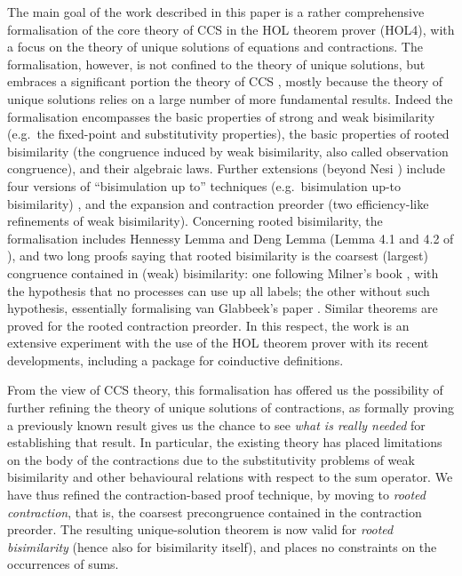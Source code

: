 The main goal of the work described in this paper is a rather
comprehensive formalisation of the core theory of CCS in the HOL
theorem prover (HOL4),  with a focus on the theory of unique solutions
of equations and contractions.
The formalisation, however, is not confined to the theory of unique
solutions, but embraces a
significant portion the theory of CCS \cite{Mil89}, mostly because the
theory of unique solutions relies on a large number of more fundamental results.
Indeed the formalisation encompasses the basic properties of strong and weak
bisimilarity (e.g.~the fixed-point and substitutivity properties), the
basic properties of
rooted bisimilarity (the congruence induced by weak
bisimilarity, also called observation congruence), and
their algebraic laws. Further extensions (beyond Nesi
\cite{Nesi:1992ve}) include four versions of ``bisimulation up to''
techniques (e.g.~bisimulation up-to bisimilarity) \cite{Mil89,sangiorgi1992problem}, and the
expansion and contraction preorder (two
efficiency-like refinements of weak bisimilarity). Concerning rooted bisimilarity, the formalisation
includes Hennessy Lemma and Deng Lemma (Lemma 4.1 and 4.2 of
\cite{Gorrieri:2015jt}),
 and two long proofs saying that  rooted bisimilarity is the coarsest (largest)
 congruence contained in (weak) bisimilarity: one following Milner's
 book \cite{Mil89}, with the hypothesis that no processes can use up
 all labels;
the other without such hypothesis, essentially formalising van Glabbeek's paper \cite{van2005characterisation}.
Similar theorems are proved for the rooted contraction preorder.
In this respect, the work is an extensive experiment with the use of the HOL theorem prover with its
recent developments, including a package for coinductive definitions.

From the view of CCS theory, this formalisation has offered us the possibility of
further refining the theory of unique solutions of contractions, as
formally proving a previously known result gives us the
chance to see \emph{what is really needed} for establishing that result.
In particular, the existing theory \cite{sangiorgi2017equations} has
placed limitations on the body of the contractions due to the
substitutivity problems of weak bisimilarity and other behavioural relations with respect
to the sum operator.
We have thus refined the contraction-based proof technique, by moving to  
\emph{rooted contraction}, that is, the coarsest precongruence contained in the contraction
preorder. The resulting unique-solution theorem is now valid for
\emph{rooted bisimilarity} (hence also for bisimilarity itself), and places no 
constraints on the occurrences of sums.

